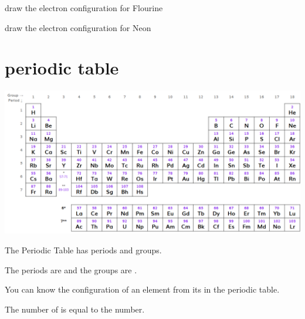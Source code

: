\documentclass[12pt,answers]{exam}
\begin{document}
\begin{questions}

\question draw the electron configuration for Flourine  



\question draw the electron configuration for Neon  


\pagebreak

\section{periodic table}

\includegraphics[width=15cm]{../../../../public/images/ptable_white.png}

\question The Periodic Table has \fillin[7][1cm] periods and \fillin[18][1cm] groups.

\question The periods are \fillin[horizontal][3cm] and the groups are \fillin[vertical][3cm]. 

\question You can know the \fillin[electron][3cm] configuration of an element from its \fillin[position][3cm] in the periodic table.

\question The number of \fillin[shells][2cm] is equal to the \fillin[Period][2cm] number.


\end{questions}
\end{document}
